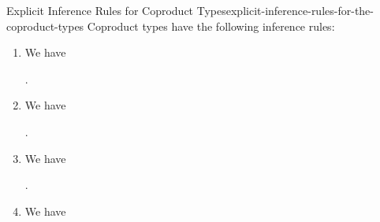 \begin{remark}{Explicit Inference Rules for Coproduct Types}{explicit-inference-rules-for-the-coproduct-types}%
    Coproduct types have the following inference rules:
    \begin{enumerate}
        \item\label{explicit-inference-rules-for-the-coproduct-types-formation}We have
            \begin{webprooftree}%
                \begin{prooftree}%
                \end{prooftree}%
                .%
            \end{webprooftree}%
        \item\label{explicit-inference-rules-for-the-coproduct-types-introduction-1}We have
            \begin{webprooftree}%
                \begin{prooftree}%
                \end{prooftree}%
                .%
            \end{webprooftree}%
        \item\label{explicit-inference-rules-for-the-coproduct-types-introduction-2}We have
            \begin{webprooftree}%
                \begin{prooftree}%
                \end{prooftree}%
                .%
            \end{webprooftree}%
        \item\label{explicit-inference-rules-for-the-coproduct-types-induction}We have
            \begin{webprooftree}%
                \begin{prooftree}%

\end{prooftree}
\end{webprooftree}
\end{enumerate}
\end{remark}
